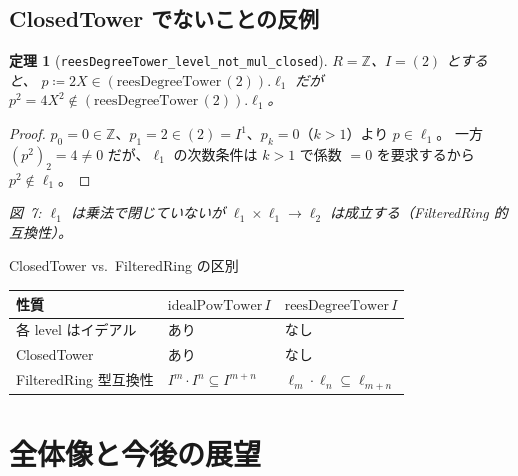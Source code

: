 \documentclass[a4paper,12pt]{article}
\theoremstyle{definition}
\theoremstyle{plain}
\newtheorem{theorem}[definition]{定理}
\newcommand{\figcap}[1]{\begin{center}\small\textit{#1}\end{center}}
\newcommand{\reesdeg}{\mathrm{reesDegreeTower}}
\newcommand{\idealpow}{\mathrm{idealPowTower}}
\newcommand{\lev}[1]{\ell_{#1}}
\begin{document}
\subsection{ClosedTower でないことの反例}

\begin{theorem}[\texttt{reesDegreeTower\_level\_not\_mul\_closed}]
$R = \mathbb{Z}$、$I = (2)$ とすると、
$p \coloneqq 2X \in (\reesdeg\,(2)).\lev{1}$ だが
$p^2 = 4X^2 \notin (\reesdeg\,(2)).\lev{1}$。
\end{theorem}
\begin{proof}
$p_0 = 0 \in \mathbb{Z}$、$p_1 = 2 \in (2) = I^1$、$p_k = 0$（$k > 1$）より $p \in \lev{1}$。
一方 $(p^2)_2 = 4 \neq 0$ だが、$\lev{1}$ の次数条件は $k > 1$ で係数 $= 0$ を要求するから
$p^2 \notin \lev{1}$。
\end{proof}

\begin{center}
\end{center}
\figcap{図~7: $\lev{1}$ は乗法で閉じていないが $\lev{1} \times \lev{1} \to \lev{2}$ は成立する（FilteredRing 的互換性）。}

\begin{dualbox}{ClosedTower vs.\ FilteredRing の区別}
\begin{center}
\renewcommand{\arraystretch}{1.3}
\begin{tabular}{lll}
\toprule
性質 & $\idealpow\,I$ & $\reesdeg\,I$ \\
\midrule
各 level はイデアル & あり & なし \\
ClosedTower & あり & なし \\
FilteredRing 型互換性 & $I^m \cdot I^n \subseteq I^{m+n}$ & $\lev{m} \cdot \lev{n} \subseteq \lev{m+n}$ \\
\bottomrule
\end{tabular}
\end{center}
\end{dualbox}

\section{全体像と今後の展望}
\end{document}
